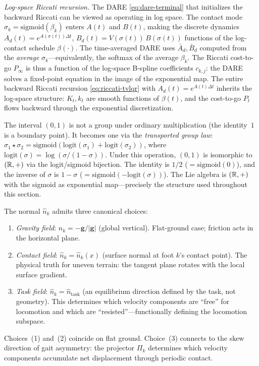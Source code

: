 \smallskip\noindent\emph{Log-space Riccati recursion.}
The DARE \eqref{eq:dare-terminal} that initializes the backward Riccati
can be viewed as operating in log space.
The contact mode $\sigma_k = \mathrm{sigmoid}(\beta_k)$ enters $A(t)$
and $B(t)$, making the discrete dynamics
$A_d(t) = e^{A(\sigma(t))\Delta t}$, $B_d(t) = V(\sigma(t))\,B(\sigma(t))$
functions of the log-contact schedule $\beta(\cdot)$.
The time-averaged DARE uses $\bar{A}_d, \bar{B}_d$ computed from the
\emph{average} $\sigma_k$---equivalently, the softmax of the average
$\beta_k$.
The Riccati cost-to-go $P_\infty$ is thus a function of the log-space
B-spline coefficients $c_{k,j}$: the DARE solves a fixed-point equation
in the image of the exponential map.
The entire backward Riccati recursion
\eqref{eq:riccati-tvlqr} with $A_d(t) = e^{A(t)\Delta t}$ inherits
the log-space structure: $K_t, k_t$ are smooth functions of $\beta(t)$,
and the cost-to-go $P_t$ flows backward through the exponential
discretization.

\begin{remark}
\label{rem:group-law}
The interval $(0,1)$ is not a group under ordinary multiplication
(the identity~$1$ is a boundary point).
It becomes one via the \emph{transported group law}:
$\sigma_1 \star \sigma_2
= \mathrm{sigmoid}(\mathrm{logit}(\sigma_1) + \mathrm{logit}(\sigma_2))$,
where $\mathrm{logit}(\sigma) = \log(\sigma/(1{-}\sigma))$.
Under this operation, $(0,1)$ is isomorphic to $(\mathbb{R}, +)$ via the
logit/sigmoid bijection.
The identity is $1/2$ ($= \mathrm{sigmoid}(0)$), and the inverse of
$\sigma$ is $1 - \sigma$
($= \mathrm{sigmoid}(-\mathrm{logit}(\sigma))$).
The Lie algebra is $(\mathbb{R}, +)$ with the sigmoid as exponential
map---precisely the structure used throughout this section.
\end{remark}

\begin{remark}
\label{rem:reference-fields}
The normal $\hat{n}_k$ admits three canonical choices:
\begin{enumerate}[nosep]
\item \emph{Gravity field}: $\hat{n}_k = -\mathbf{g}/|\mathbf{g}|$
  (global vertical).
  Flat-ground case; friction acts in the horizontal plane.
\item \emph{Contact field}: $\hat{n}_k = \hat{n}_k(x)$
  (surface normal at foot $k$'s contact point).
  The physical truth for uneven terrain: the tangent plane
  rotates with the local surface gradient.
\item \emph{Task field}: $\hat{n}_k = \hat{n}_{\mathrm{task}}$
  (an equilibrium direction defined by the task, not geometry).
  This determines which velocity components are ``free'' for
  locomotion and which are ``resisted''---functionally
  defining the locomotion subspace.
\end{enumerate}
Choices~(1) and~(2) coincide on flat ground.
Choice~(3) connects to the skew direction of gait asymmetry:
the projector $\Pi_k$ determines which velocity components accumulate
net displacement through periodic contact.
\end{remark}

